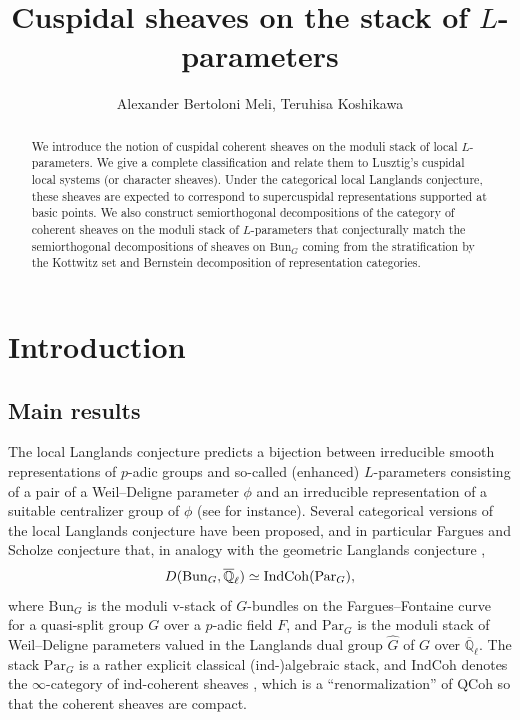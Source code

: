 \documentclass{amsart}
\title{Cuspidal sheaves on the stack of $L$-parameters}
\author{Alexander Bertoloni Meli, Teruhisa Koshikawa}
\theoremstyle{definition}
\theoremstyle{remark}
\numberwithin{equation}{section}
\newcommand{\Q}{\mathbb{Q}}
\newcommand{\wh}{\widehat}
\newcommand{\Bun}{\mathrm{Bun}}
\newcommand{\Par}{\mathrm{Par}}
\newcommand{\IndCoh}{\mathrm{IndCoh}}
\newcommand{\QCoh}{\mathrm{QCoh}}
\begin{document}
\begin{abstract}
We introduce the notion of cuspidal coherent sheaves on the moduli stack of local $L$-parameters. We give a complete classification and relate them to Lusztig's cuspidal local systems (or character sheaves). Under the categorical local Langlands conjecture, these sheaves are expected to correspond to supercuspidal representations supported at basic points. We also construct semiorthogonal decompositions of the category of coherent sheaves on the moduli stack of $L$-parameters that conjecturally match the semiorthogonal decompositions of sheaves on $\Bun_G$ coming from the stratification by the Kottwitz set and Bernstein decomposition of representation categories.
\end{abstract}

\maketitle

\tableofcontents

\section{Introduction}
\subsection{Main results}
The local Langlands conjecture predicts a bijection between irreducible smooth representations of $p$-adic groups and so-called (enhanced) $L$-parameters consisting of a pair of a Weil--Deligne parameter $\phi$ and an irreducible representation of a suitable centralizer group of $\phi$ (see \cite{KalethaLLCnonQS} for instance). Several categorical versions of the local Langlands conjecture have been proposed, and in particular Fargues and Scholze \cite{fargues--scholze} conjecture that, in analogy with the geometric Langlands conjecture \cite{ArinkinGaitsgory}, 
\begin{equation}{\label{eqn: FSCLLC}}
    D(\Bun_G, \overline{\mathbb{Q}}_\ell) \simeq \IndCoh(\Par_G), 
\end{equation}
where $\Bun_G$ is the moduli v-stack of $G$-bundles on the Fargues--Fontaine curve for a quasi-split group $G$ over a $p$-adic field $F$, and $\Par_G$ is the moduli stack of Weil--Deligne parameters valued in the Langlands dual group $\wh G$ of $G$ over $\overline{\Q}_\ell$. The stack $\Par_G$ is a rather explicit classical (ind-)algebraic stack, and $\IndCoh$ denotes the $\infty$-category of ind-coherent sheaves \cite{GaitsgoryIndCohSheaves}, which is a ``renormalization'' of $\QCoh$ so that the coherent sheaves are compact. 
\end{document}

